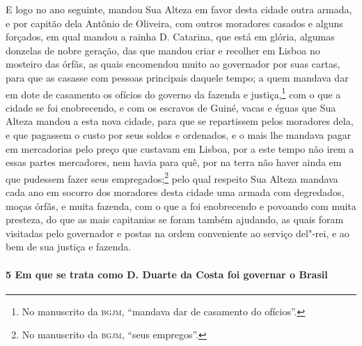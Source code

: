 E logo no ano seguinte, mandou Sua Alteza em favor desta cidade outra armada, e por
capitão dela Antônio de Oliveira, com outros moradores casados e alguns forçados, em qual
mandou a rainha D. Catarina, que está em glória, algumas donzelas de nobre geração, das
que mandou criar e recolher em Lisboa no mosteiro das órfãs, as quais encomendou muito ao
governador por suas cartas, para que as casasse com pessoas principais daquele tempo; a
quem mandava dar em dote de casamento os ofícios do governo da fazenda e
justiça,\footnote{ No manuscrito da \textsc{bgjm}, ``mandava dar de casamento do
ofícios''.} com o que a cidade se foi enobrecendo, e com os escravos de Guiné, vacas e
éguas que Sua Alteza mandou a esta nova cidade, para que se repartissem pelos moradores
dela, e que pagassem o custo por seus soldos e ordenados, e o mais lhe mandava pagar em
mercadorias pelo preço que custavam em Lisboa, por a este tempo não irem a essas partes
mercadores, nem havia para quê, por na terra não haver ainda em que pudessem fazer seus
empregados;\footnote{ No manuscrito da \textsc{bgjm}, ``seus empregos''.} pelo qual
respeito Sua Alteza mandava cada ano em socorro dos moradores desta cidade uma armada com
degredados, moças órfãs, e muita fazenda, com o que a foi enobrecendo e povoando com muita
presteza, do que as mais capitanias se foram também ajudando, as quais foram visitadas
pelo governador e postas na ordem conveniente ao serviço del"-rei, e ao bem de sua justiça
e fazenda.

\paragraph{5 Em que se trata como D. Duarte da Costa foi governar o Brasil}

